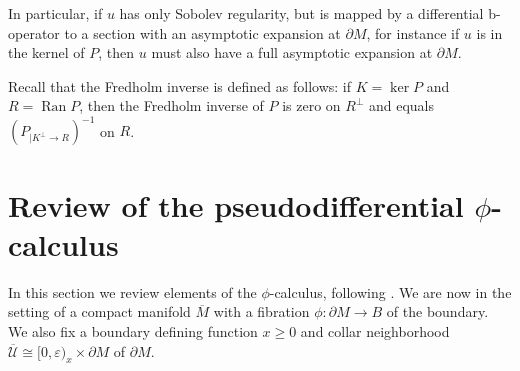 \documentclass[JEP,XML,SOM,Unicode,NoFloatCountersInSection,published]{cedram}
\theoremstyle{plain}
\theoremstyle{definition}
\newcommand{\Umathbar}{{\overline{\mathscr{U}}}}
\DeclareMathOperator\Ran{Ran}
\newcommand{\dM}{{\partial M}}
\newcommand{\Mbar}{{\overline{M}}}\let\M\Mbar
\let\eps\varepsilon
\begin{document}
In particular, if $u$ has only Sobolev regularity, but is mapped by a differential b\nobreakdash-operator
to a section with an asymptotic expansion at $\partial M$, for instance if $u$ is in
the kernel of $P$, then $u$ must also have a full asymptotic expansion at $\partial M$.

Recall that the Fredholm inverse is defined as follows: if $K= \ker P$ and $R=\Ran P$, then the Fredholm inverse of $P$ is zero on $R^\perp$ and equals $(P_{|K^\perp\to R})^{-1}$ on $R$.

\section{Review of the pseudodifferential \texorpdfstring{$\phi$}{phi}-calculus}\label{sec:phi-calc}
In this section we review elements of the $\phi$-calculus,
following \cite{mazzeo1998pseudodifferential}.
We are now in the setting
of a compact manifold $\Mbar$ with a fibration $\phi:\partial M\to B$ of the boundary. We also fix a boundary defining function $x \geq 0$ and collar neighborhood $\Umathbar\cong [0,\eps)_x\times\dM$ of $\dM$.
\end{document}
